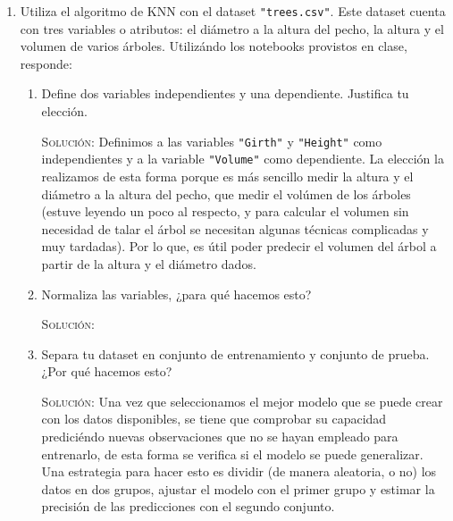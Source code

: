 \documentclass[letterpaper,11pt]{article}
\begin{document}
\begin{enumerate}
\begin{proof}
        Por lo tanto, el polinomio característico de la matriz $A$ puede ser 
        expresado como 
        \begin{equation*}
            p(\lambda) = \lambda^2 - \lambda tr(A) + det(A)
        \end{equation*}
    \end{proof}

    \item Utiliza el algoritmo de KNN con el dataset \texttt{"trees.csv"}. Este 
    dataset cuenta con tres variables o atributos: el diámetro a la altura del 
    pecho, la altura y el volumen de varios árboles. Utilizándo los notebooks 
    provistos en clase, responde:
    \begin{enumerate}
        \item Define dos variables independientes y una dependiente. Justifica 
        tu elección.

        \textsc{Solución:} Definimos a las variables \texttt{"Girth"} y 
        \texttt{"Height"} como independientes y a la variable \texttt{"Volume"}
        como dependiente. La elección la realizamos de esta forma porque es 
        más sencillo medir la altura y el diámetro a la altura del pecho, que 
        medir el volúmen de los árboles (estuve leyendo un poco al respecto, y 
        para calcular el volumen sin necesidad de talar el árbol se necesitan 
        algunas técnicas complicadas y muy tardadas). Por lo que, es útil poder 
        predecir el volumen del árbol a partir de la altura y el diámetro dados.

        \item Normaliza las variables, ¿para qué hacemos esto?

        \textsc{Solución:}

        \item Separa tu dataset en conjunto de entrenamiento y conjunto de 
        prueba. ¿Por qué hacemos esto?

        \textsc{Solución:} Una vez que seleccionamos el mejor modelo que se 
        puede crear con los datos disponibles, se tiene que comprobar su 
        capacidad prediciéndo nuevas observaciones que no se hayan empleado 
        para entrenarlo, de esta forma se verifica si el modelo se puede 
        generalizar. Una estrategia para hacer esto es dividir (de manera 
        aleatoria, o no) los datos en dos grupos, ajustar el modelo con el 
        primer grupo y estimar la precisión de las predicciones con el 
        segundo conjunto.


\end{enumerate}
\end{enumerate}
\end{document}
